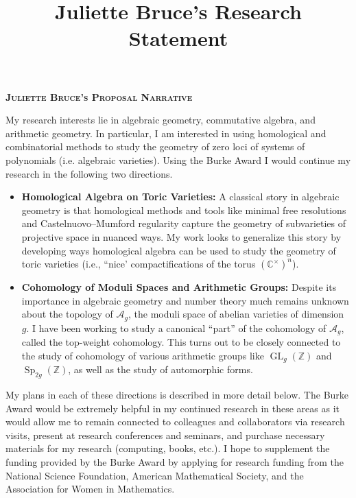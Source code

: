 \documentclass[11pt,reqno]{amsart}
\title{Juliette Bruce's Research Statement}
\theoremstyle{remark}
\newcommand{\GL}{{\operatorname{GL}}}
\newcommand{\Sp}{\operatorname{Sp}}
\newcommand{\cA}{\mathcal{A}}
\newcommand{\C}{\mathbb{C}}
\newcommand{\Z}{\mathbb{Z}}
\begin{document}
 

\begingroup  
  \centering
  \large\scshape\bfseries Juliette Bruce's Proposal Narrative\\[1em]
\endgroup


\setcounter{section}{0}

My research interests lie in algebraic geometry, commutative algebra, and arithmetic geometry. In particular, I am interested in using homological and combinatorial methods to study the geometry of zero loci of systems of polynomials (i.e. algebraic varieties). Using the Burke Award I would continue my research in the following two directions. 

\begin{itemize}[leftmargin=*]
\item \textbf{Homological Algebra on Toric Varieties:} A classical story in algebraic geometry is that homological methods and tools like minimal free resolutions and Castelnuovo--Mumford  regularity capture the geometry of subvarieties of projective space in nuanced ways. My work looks to generalize this story by developing ways homological algebra can be used to study the geometry of toric varieties (i.e., ``nice' compactifications of the torus $(\C^{\times})^{n}$). 

\item \textbf{Cohomology of Moduli Spaces and Arithmetic Groups:} Despite its importance in algebraic geometry and number theory much remains unknown about the topology of $\cA_{g}$, the moduli space of abelian varieties of dimension $g$. I have been working to study a canonical ``part'' of the cohomology of $\mathcal{A}_{g}$, called the top-weight cohomology. This turns out to be closely connected to the study of cohomology of various arithmetic groups like $\GL_{g}(\Z)$ and $\Sp_{2g}(\Z)$, as well as the study of automorphic forms. 

\end{itemize}

My plans in each of these directions is described in more detail below. The Burke Award would be extremely helpful in my continued research in these areas as it would allow me to remain connected to colleagues and collaborators via research visits, present at research conferences and seminars, and purchase necessary materials for my research (computing, books, etc.). I hope to supplement the funding provided by the Burke Award by applying for research funding from the National Science Foundation, American Mathematical Society, and the Association for Women in Mathematics. 
\end{document}
